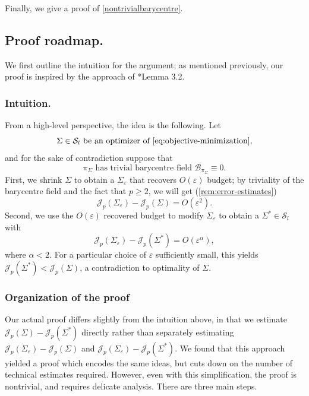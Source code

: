 \documentclass[preprint, reqno]{amsart}
\renewcommand{\epsilon}{\varepsilon}
\theoremstyle{definition}
\numberwithin{equation}{section}
\begin{document}
Finally, we give a proof of \cref{nontrivialbarycentre}.

\subsection{Proof roadmap.} \label{sec:proof-roadmap}

We first outline the intuition for the argument; as mentioned
previously, our proof is inspired by the approach of
\cite{Delattre17}*{Lemma 3.2}.

\subsubsection{Intuition.} \label{sec:proof-intuition}
From a high-level perspective, the idea is the following. Let
\begin{equation}
  \label{eqn:sigma-optimal}
  \text{$\Sigma \in \mathcal{S}_l$ be an optimizer of
    \eqref{eq:objective-minimization},}
\end{equation}
and for the sake of contradiction suppose that
\begin{equation}
  \label{eqn:barycentrezero}
  \text{$\pi_{\Sigma}$ has trivial barycentre field
    $\mathcal{B}_{\pi_\Sigma} \equiv 0$.}
\end{equation}
First, we shrink $\Sigma$ to obtain a $\Sigma_\epsilon$ that recovers
$O(\epsilon)$ budget; by triviality of the barycentre field and the
fact that $p \geq 2$, we will get (\cref{rem:error-estimates})
\[
  \mathscr{J}_p(\Sigma_\epsilon) -
  \mathscr J_p(\Sigma) = O(\epsilon^2).
\]
Second, we use the $O(\epsilon)$ recovered budget to modify
$\Sigma_\epsilon$ to obtain a $\Sigma^* \in \mathcal S_l$ with
\[
  \mathscr{J}_p(\Sigma_\epsilon) - \mathscr{J}_p(\Sigma^*) =
  O(\epsilon^\alpha),
\]
where $\alpha < 2$. For a particular choice of $\epsilon$ sufficiently
small, this yields $\mathscr J_p(\Sigma^*) < \mathscr J_p(\Sigma)$, a
contradiction to optimality of $\Sigma$.

\subsubsection{Organization of the proof} Our actual proof differs
slightly from the intuition above, in that we estimate $\mathscr
J_p(\Sigma) - \mathscr J_p(\Sigma^*)$ directly rather than separately
estimating $\mathscr J_p(\Sigma_\epsilon) - \mathscr J_p(\Sigma)$ and
$\mathscr J_p(\Sigma_\epsilon) - \mathscr J_p(\Sigma^*)$. We found
that this approach yielded a proof which encodes the same ideas, but
cuts down on the number of technical estimates required. However, even
with this simplification, the proof is nontrivial, and requires
delicate analysis. There are three main steps.
\end{document}

